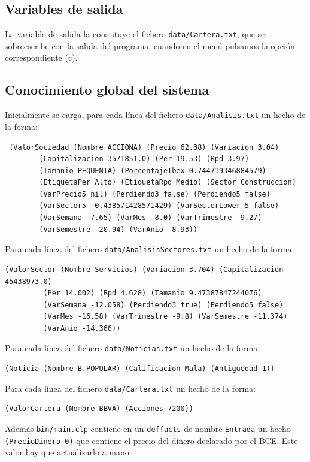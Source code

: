 \documentclass[a4paper,11pt]{article}
\begin{document}
\subsection{Variables de salida}
La variable de salida la constituye el fichero \texttt{data/Cartera.txt}, que se sobreescribe con la salida del programa, cuando
en el menú pulsamos la opción correspondiente (c).

\subsection{Conocimiento global del sistema}
Inicialmente se carga, para cada línea del fichero \texttt{data/Analisis.txt} un hecho de la forma:

\begin{verbatim}
 (ValorSociedad (Nombre ACCIONA) (Precio 62.38) (Variacion 3.04) 
		(Capitalizacion 3571851.0) (Per 19.53) (Rpd 3.97) 
		(Tamanio PEQUENIA) (PorcentajeIbex 0.744719346884579) 
		(EtiquetaPer Alto) (EtiquetaRpd Medio) (Sector Construccion) 
		(VarPrecio5 nil) (Perdiendo3 false) (Perdiendo5 false) 
		(VarSector5 -0.438571428571429) (VarSectorLower-5 false)
		(VarSemana -7.65) (VarMes -8.0) (VarTrimestre -9.27) 
		(VarSemestre -20.94) (VarAnio -8.93))
\end{verbatim}

Para cada línea del fichero \texttt{data/AnalisisSectores.txt} un hecho de la forma:
\begin{verbatim}
(ValorSector (Nombre Servicios) (Variacion 3.704) (Capitalizacion 45438973.0) 
	     (Per 14.002) (Rpd 4.628) (Tamanio 9.47387847244076) 
	     (VarSemana -12.058) (Perdiendo3 true) (Perdiendo5 false) 
	     (VarMes -16.58) (VarTrimestre -9.8) (VarSemestre -11.374) 
	     (VarAnio -14.366))
\end{verbatim}

Para cada línea del fichero \texttt{data/Noticias.txt} un hecho de la forma:
\begin{verbatim}
(Noticia (Nombre B.POPULAR) (Calificacion Mala) (Antiguedad 1))
\end{verbatim}

Para cada línea del fichero \texttt{data/Cartera.txt} un hecho de la forma:
\begin{verbatim}
(ValorCartera (Nombre BBVA) (Acciones 7200))
\end{verbatim}


Además \texttt{bin/main.clp} contiene en un \texttt{deffacts} de nombre \texttt{Entrada} un hecho \texttt{(PrecioDinero 0)}
que contiene el precio del dinero declarado por el BCE. Este valor hay que actualizarlo a mano.
\end{document}
